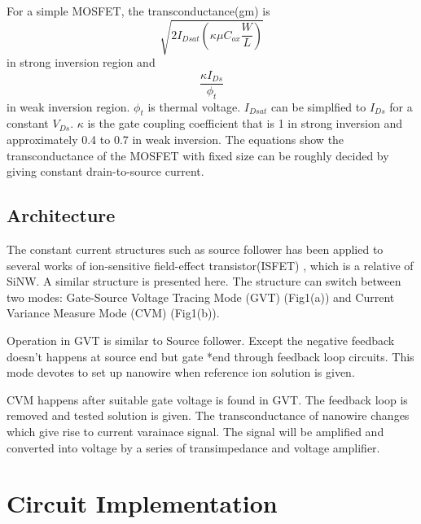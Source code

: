\documentclass{article}
\begin{document}
For a simple MOSFET, the transconductance(gm) is
\begin{equation}
    \sqrt{2I_{Dsat} (\kappa \mu C_{ox} \frac{W}{L})}
\end{equation}
in strong inversion region and
\begin{equation}
    \frac{\kappa I_{Ds}}{\phi_t}
\end{equation}
in weak inversion region. $\phi_t$ is thermal voltage.
$I_{Dsat}$ can be simplfied to $I_{Ds}$ for a constant $V_{Ds}$.
$\kappa$ is the gate coupling coefficient that is 1 in strong inversion and approximately 0.4 to 0.7 in weak inversion.
The equations show the transconductance of the MOSFET with fixed size can be roughly decided by giving constant drain-to-source current.

\subsection{Architecture}
The constant current structures such as source follower has been applied to several works of ion-sensitive field-effect transistor(ISFET) \cite{J6,C7}, which is a relative of SiNW.
A similar structure is presented here. The structure can switch between two modes: Gate-Source Voltage Tracing Mode (GVT) (Fig1(a)) and Current Variance Measure Mode (CVM) (Fig1(b)).

Operation in GVT is similar to Source follower.
Except the negative feedback doesn’t happens at source end but gate *end through feedback loop circuits.
This mode devotes to set up nanowire when reference ion solution is given.

CVM happens after suitable gate voltage is found in GVT.
The feedback loop is removed and tested solution is given.
The transconductance of nanowire changes which give rise to current varainace signal.
The signal will be amplified and converted into voltage by a series of transimpedance and voltage amplifier.

\section{Circuit Implementation}




%
%
%
%
\end{document}
